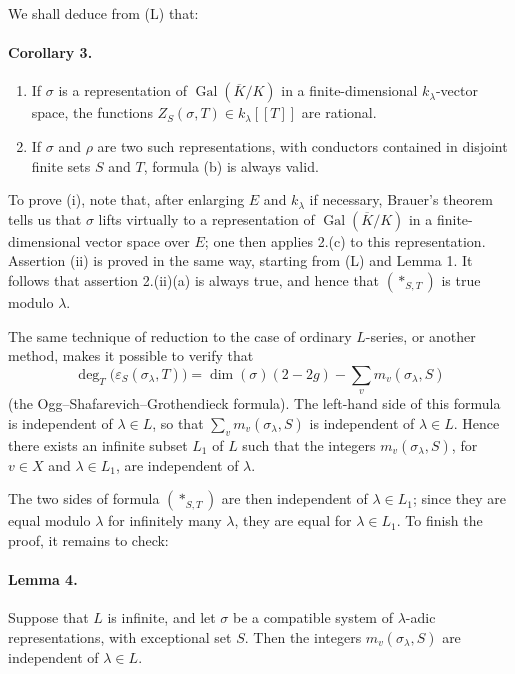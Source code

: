\documentclass[11pt]{article}
\newcommand{\Gal}{\operatorname{Gal}}
\newcommand{\dimn}{\operatorname{dim}}
\newcommand{\eps}{\varepsilon}
\begin{document}
We shall deduce from (L) that:

\paragraph{Corollary 3.}
\begin{enumerate}[label=(\roman*)]
\item If $\sigma$ is a representation of $\Gal(\overline K/K)$ in a finite-dimensional $k_\lambda$-vector space, the functions $Z_S(\sigma,T)\in k_\lambda[[T]]$ are rational.
\item If $\sigma$ and $\rho$ are two such representations, with conductors contained in disjoint finite sets $S$ and $T$, formula (b) is always valid.
\end{enumerate}

To prove (i), note that, after enlarging $E$ and $k_\lambda$ if necessary, Brauer's theorem tells us that $\sigma$ lifts virtually to a representation of $\Gal(\overline K/K)$ in a finite-dimensional vector space over $E$; one then applies 2.(c) to this representation. Assertion (ii) is proved in the same way, starting from (L) and Lemma 1. It follows that assertion 2.(ii)(a) is always true, and hence that $(*_{S,T})$ is true modulo $\lambda$.

The same technique of reduction to the case of ordinary $L$-series, or another method, makes it possible to verify that
\[
 \deg_T\bigl(\eps_S(\sigma_\lambda,T)\bigr)
 =\dimn(\sigma)(2-2g)-\sum_v m_v(\sigma_\lambda,S)
\]
(the Ogg--Shafarevich--Grothendieck formula). The left-hand side of this formula is independent of $\lambda\in L$, so that $\sum_v m_v(\sigma_\lambda,S)$ is independent of $\lambda\in L$. Hence there exists an infinite subset $L_1$ of $L$ such that the integers $m_v(\sigma_\lambda,S)$, for $v\in X$ and $\lambda\in L_1$, are independent of $\lambda$.

The two sides of formula $(*_{S,T})$ are then independent of $\lambda\in L_1$; since they are equal modulo $\lambda$ for infinitely many $\lambda$, they are equal for $\lambda\in L_1$. To finish the proof, it remains to check:

\paragraph{Lemma 4.} Suppose that $L$ is infinite, and let $\sigma$ be a compatible system of $\lambda$-adic representations, with exceptional set $S$. Then the integers $m_v(\sigma_\lambda,S)$ are independent of $\lambda\in L$.
\end{document}
